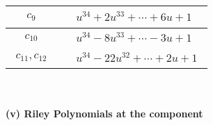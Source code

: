 \documentclass[1p]{elsarticle_modified}
\theoremstyle{definition}
\begin{document}
\begin{tabular}{m{50pt}|m{274pt}}
\hline $$\begin{aligned}c_{9}\end{aligned}$$&$\begin{aligned}
&u^{34}+2 u^{33}+\cdots+6 u+1
\end{aligned}$\\
\hline $$\begin{aligned}c_{10}\end{aligned}$$&$\begin{aligned}
&u^{34}-8 u^{33}+\cdots-3 u+1
\end{aligned}$\\
\hline $$\begin{aligned}c_{11},c_{12}\end{aligned}$$&$\begin{aligned}
&u^{34}-22 u^{32}+\cdots+2 u+1
\end{aligned}$\\
\hline
\end{tabular}\\~\\
\newpage\renewcommand{\arraystretch}{1}
\flushleft \textbf{(v) Riley Polynomials at the component}\newline \\
\end{document}
